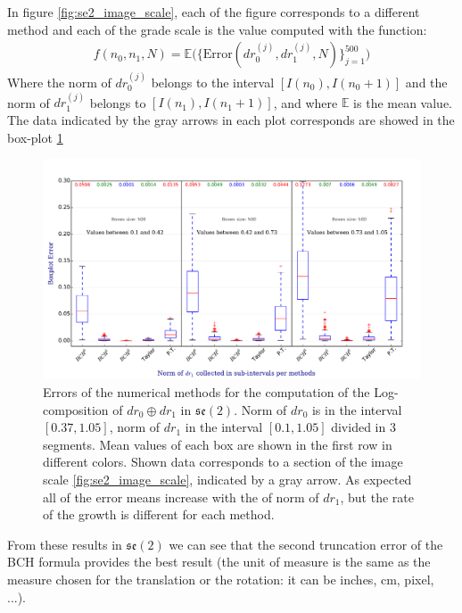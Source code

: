 In figure \ref{fig:se2_image_scale}, each of the figure corresponds to a different method and each of the grade scale is the value computed with the function:
\begin{align*}
f(n_0,n_1,N) 
=
 \mathbb{E}\Big(
  \{ 
  \text{Error}(dr_{0}^{(j)},dr_{1}^{(j)},N) 
  \}_{j=1}^{500}
  \Big)
\end{align*}
Where the norm of $dr_{0}^{(j)}$ belongs to the interval $[I(n_0), I(n_0+1)]$ and the norm of 
$dr_{1}^{(j)}$ belongs to $[I(n_1), I(n_1+1)]$, and where $\mathbb{E}$ is the mean value.\\
The data indicated by the gray arrows in each plot corresponds are showed in the box-plot \ref{fig:se2_boxplot}
%
\begin{figure}[!ht]
	\hspace{-1cm}
	\includegraphics[scale=0.51]{figures/se2_boxplot.pdf}
	\caption{Errors of the numerical methods for the computation of the Log-composition of $dr_{0} \oplus dr_{1}$ in $\mathfrak{se}(2)$. Norm of $dr_{0}$ is in the interval $[0.37,1.05]$, norm of $dr_{1}$ in the interval $[0.1, 1.05]$ divided in 3 segments. Mean values of each box are shown in the first row in different colors. Shown data corresponds to a section of the image scale \ref{fig:se2_image_scale}, indicated by a gray arrow. As expected all of the error means increase with the of norm of $dr_1$, but the rate of the growth is different for each method.}
	\label{fig:se2_boxplot}
\end{figure}
%

From these results in $\mathfrak{se}(2)$ we can see that the second truncation error of the BCH formula provides the best result (the unit of measure is the same as the measure chosen for the translation or the rotation: it can be inches, cm, pixel, ...).

